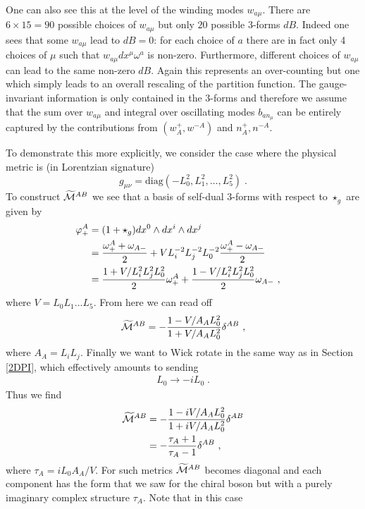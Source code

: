 \documentclass[11pt]{article}
\numberwithin{equation}{section}
\begin{document}
One can also see this at the level of the winding modes $w_{a\mu}$. There are $6\times 15=90$ possible choices of $w_{a\mu }$ but only $20$ possible 3-forms $dB$. Indeed one sees that some $w_{a\mu}$ lead to $dB=0$: for each choice of $a$ there are in fact only 4 choices of $\mu$  such that $w_{a\mu} dx^\mu \omega^a$ is non-zero.   Furthermore, different choices of $w_{a\mu }$ can lead to the same non-zero $dB$. Again this represents an over-counting but one which simply leads to an overall rescaling of the partition function. The gauge-invariant information is only contained in the 3-forms and therefore we assume that the sum over $w_{a\mu}$ and integral over oscillating modes $b_{a n_\mu}$ can be entirely captured by the contributions from $(w^+_A, w^{-A})$ and $n^+_A,n^{-A}$. 

To demonstrate this more explicitly, we consider the case where the physical metric is (in  Lorentzian signature)
\begin{equation}
g_{\mu\nu} = \text{diag}\left(-L_0^2, L^2_1, \ldots,L_5^2\right)\;.
\end{equation}
To construct $\widetilde{\cal M}^{AB}$ we see that a basis of self-dual 3-forms with respect to $\star_g$ are given by
\begin{align}
\varphi^A_+ &= (1+\star_g) dx^0\wedge dx^i\wedge dx^j \cr
& = \frac{\omega^A_{+}+\omega_{A-}}{2}
+V L_i^{-2}L_j^{-2}L_0^{-2}\frac{\omega^A_{+}-\omega_{A-}}{2}\cr
& = \frac{1+V/L^2_i L^2_j L_0^2}{2}\omega^A_{+} + 
\frac{1-V/L^2_i L^2_j L_0^2}{2}\omega_{A-}\ ,
\end{align}
where $V = L_0L_1\ldots L_5$. From here we can read off
\begin{align}
\widetilde {\cal M}^{AB} = - 	\frac{1-V/A_AL_0^2}{1+V/A_AL_0^2}\delta^{AB}\ ,
\end{align} 
where $A_A = L_i L_j$. Finally we want to Wick rotate in the same way as in Section \ref{2DPI}, which effectively amounts to sending
\begin{align}
L_0\to -i L_0	\;.
\end{align}
Thus we find
\begin{align}
\widetilde {\cal M}^{AB} &= - 	\frac{1-i V/A_AL_0^2}{1+i V/A_AL_0^2}\delta^{AB}\nonumber\\
&=-\frac{\tau_A+1}{\tau_A-1}\delta^{AB}\ ,
\end{align}
where $\tau_A=i L_0A_A/V$. For such metrics $\widetilde{\cal M}^{AB}$ becomes diagonal and each component has the form that we saw for the chiral boson but with a purely imaginary complex structure $\tau_A$. Note that in this case
\end{document}
